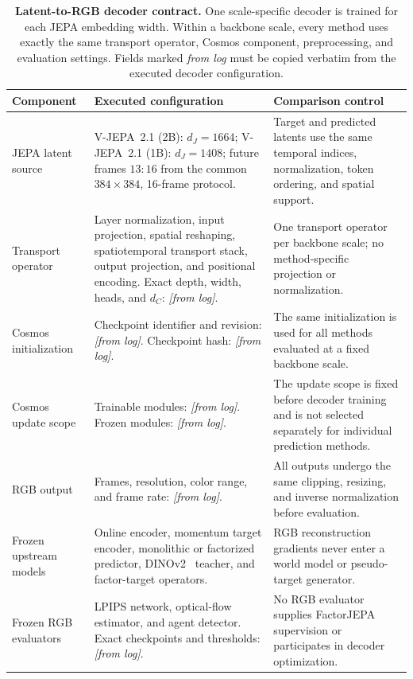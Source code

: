 \begin{table}[t]
\centering
\caption{
\textbf{Latent-to-RGB decoder contract.}
One scale-specific decoder is trained for each JEPA embedding width.
Within a backbone scale, every method uses exactly the same transport
operator, Cosmos component, preprocessing, and evaluation settings.
Fields marked \emph{from log} must be copied verbatim from the executed
decoder configuration.
}
\label{tab:rgb_decoder_contract}
\scriptsize
\setlength{\tabcolsep}{5pt}
\renewcommand{\arraystretch}{1.15}

\begin{tabularx}{\textwidth}{
    p{}
    >{\raggedright\arraybackslash}X
    >{\raggedright\arraybackslash}X
}
\toprule
\textbf{Component}
&
\textbf{Executed configuration}
&
\textbf{Comparison control}
\\
\midrule

\rowcolor{DecoderBlue}
JEPA latent source
&
V-JEPA~2.1 (2B): \(d_J=1664\);
V-JEPA~2.1 (1B): \(d_J=1408\);
future frames \(13{:}16\) from the common \(384\times384\),
16-frame protocol.
&
Target and predicted latents use the same temporal indices,
normalization, token ordering, and spatial support.
\\

Transport operator
&
Layer normalization, input projection, spatial reshaping,
spatiotemporal transport stack, output projection, and positional
encoding. Exact depth, width, heads, and \(d_C\):
\emph{[from log]}.
&
One transport operator per backbone scale; no method-specific
projection or normalization.
\\

Cosmos initialization
&
Checkpoint identifier and revision:
\emph{[from log]}. Checkpoint hash:
\emph{[from log]}.
&
The same initialization is used for all methods evaluated at a fixed
backbone scale.
\\

Cosmos update scope
&
Trainable modules:
\emph{[from log]}. Frozen modules:
\emph{[from log]}.
&
The update scope is fixed before decoder training and is not selected
separately for individual prediction methods.
\\

RGB output
&
Frames, resolution, color range, and frame rate:
\emph{[from log]}.
&
All outputs undergo the same clipping, resizing, and inverse
normalization before evaluation.
\\

Frozen upstream models
&
Online encoder, momentum target encoder, monolithic or factorized
predictor, DINOv2~\cite{oquab2024dinov2} teacher, and factor-target operators.
&
RGB reconstruction gradients never enter a world model or
pseudo-target generator.
\\

Frozen RGB evaluators
&
LPIPS network, optical-flow estimator, and agent detector.
Exact checkpoints and thresholds: \emph{[from log]}.
&
No RGB evaluator supplies FactorJEPA supervision or participates in
decoder optimization.
\\

\bottomrule
\end{tabularx}
\end{table}


